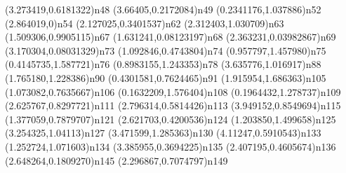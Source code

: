 \dotnode[](3.273419,0.6181322){n48}
\dotnode[](3.66405,0.2172084){n49}
\dotnode[](0.2341176,1.037886){n52}
\dotnode[](2.864019,0){n54}
\dotnode[](2.127025,0.3401537){n62}
\dotnode[](2.312403,1.030709){n63}
\dotnode[](1.509306,0.9905115){n67}
\dotnode[](1.631241,0.08123197){n68}
\dotnode[](2.363231,0.03982867){n69}
\dotnode[](3.170304,0.08031329){n73}
\dotnode[](1.092846,0.4743804){n74}
\dotnode[](0.957797,1.457980){n75}
\dotnode[](0.4145735,1.587721){n76}
\dotnode[](0.8983155,1.243353){n78}
\dotnode[](3.635776,1.016917){n88}
\dotnode[](1.765180,1.228386){n90}
\dotnode[](0.4301581,0.7624465){n91}
\dotnode[](1.915954,1.686363){n105}
\dotnode[](1.073082,0.7635667){n106}
\dotnode[](0.1632209,1.576404){n108}
\dotnode[](0.1964432,1.278737){n109}
\dotnode[](2.625767,0.8297721){n111}
\dotnode[](2.796314,0.5814426){n113}
\dotnode[](3.949152,0.8549694){n115}
\dotnode[](1.377059,0.7879707){n121}
\dotnode[](2.621703,0.4200536){n124}
\dotnode[](1.203850,1.499658){n125}
\dotnode[](3.254325,1.04113){n127}
\dotnode[](3.471599,1.285363){n130}
\dotnode[](4.11247,0.5910543){n133}
\dotnode[](1.252724,1.071603){n134}
\dotnode[](3.385955,0.3694225){n135}
\dotnode[](2.407195,0.4605674){n136}
\dotnode[](2.648264,0.1809270){n145}
\dotnode[](2.296867,0.7074797){n149}
